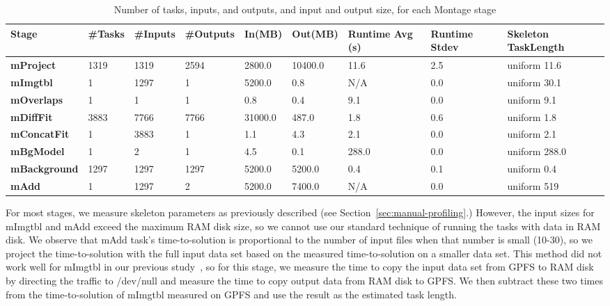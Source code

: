 \documentclass[preprint,12pt]{elsarticle}
\newcommand{\zhaonote}[1]{{\textcolor{cyan}{ ***Zhao:  #1 }}}
\newcommand{\zhaonote}[1]{}
\newcommand{\B}[1]{\textbf{#1}\xspace}
\newcommand{\N}{\newline}
\newcommand{\HF}{\hfill}
\begin{document}
\begin{table}[ht]
\begin{center}
    \caption{Number of tasks, inputs, and outputs, and input and output size, for each Montage stage}
    \begin{scriptsize}
    \begin{tabular}{ @{} p{1.9cm} p{0.65cm} p{0.80cm} p{0.85cm} p{1.00cm} p{1.00cm} p{1.10cm} p{1.1cm} p{2.1cm}@{}}
    \toprule
    \B{Stage} & \B{\#\N Tasks} & \B{\#\N Inputs} & \B{\#\N Outputs} & \B{In\N (MB)} & \B{Out\N (MB)} & \B{Runtime Avg (s)} & \B{Runtime Stdev} & \B{Skeleton Task\N Length}\\
    \midrule
    \B{mProject   } & \HF 1319 & \HF 1319 & \HF 2594 & \HF  2800.0 & \HF 10400.0 & \HF  11.6 & \HF  2.5 & uniform \HF  11.6\\
    \B{mImgtbl    } & \HF    1 & \HF 1297 & \HF    1 & \HF  5200.0 & \HF     0.8 & \HF   N/A & \HF  0.0 & uniform \HF  30.1\\
    \B{mOverlaps  } & \HF    1 & \HF    1 & \HF    1 & \HF     0.8 & \HF     0.4 & \HF   9.1 & \HF  0.0 & uniform \HF   9.1\\
    \B{mDiffFit   } & \HF 3883 & \HF 7766 & \HF 7766 & \HF 31000.0 & \HF   487.0 & \HF   1.8 & \HF  0.6 & uniform \HF   1.8\\
    \B{mConcatFit } & \HF    1 & \HF 3883 & \HF    1 & \HF     1.1 & \HF     4.3 & \HF   2.1 & \HF  0.0 & uniform \HF   2.1\\
    \B{mBgModel   } & \HF    1 & \HF    2 & \HF    1 & \HF     4.5 & \HF     0.1 & \HF 288.0 & \HF  0.0 & uniform \HF 288.0\\
    \B{mBackground} & \HF 1297 & \HF 1297 & \HF 1297 & \HF  5200.0 & \HF  5200.0 & \HF   0.4 & \HF  0.1 & uniform \HF   0.4\\
    \B{mAdd       } & \HF    1 & \HF 1297 & \HF    2 & \HF  5200.0 & \HF  7400.0 & \HF   N/A & \HF  0.0 & uniform \HF   519\\
    \bottomrule
    \end{tabular}
    \end{scriptsize}
    \label{tb:montage-stats}
\end{center}   
\end{table} 


For most stages,  
we measure skeleton parameters as previously described (see Section~\ref{sec:manual-profiling}.)  However,
the input sizes for mImgtbl and mAdd exceed the maximum RAM disk size,
so we cannot use our standard technique of running the tasks with data in RAM disk. 
We observe that mAdd task's time-to-solution is proportional 
to the number of input files when that number is small (10-30), so we project the time-to-solution 
with the full input data set based on the measured time-to-solution on a smaller data set.
This method did not work well for mImgtbl in our previous study~\cite{Skeleton2013}, so for this stage, we measure the time to copy the input data set from GPFS to RAM disk by directing
the traffic to /dev/null and measure the time to copy output data from RAM disk to GPFS. 
We then subtract these two times from the time-to-solution of mImgtbl measured on GPFS and use
the result as the estimated task length. 
\end{document}
